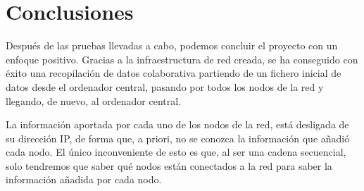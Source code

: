 \section{Conclusiones}
Después de las pruebas llevadas a cabo, podemos concluir el proyecto con un enfoque positivo. Gracias a la infraestructura de red creada, se ha conseguido con éxito una recopilación de datos colaborativa partiendo de un fichero inicial de datos desde el ordenador central, pasando por todos los nodos de la red y llegando, de nuevo, al ordenador central.

La información aportada por cada uno de los nodos de la red, está desligada de su dirección IP, de forma que, a priori, no se conozca la información que añadió cada nodo. El único inconveniente de esto es que, al ser una cadena secuencial, solo tendremos que saber qué nodos están conectados a la red para saber la información añadida por cada nodo.

